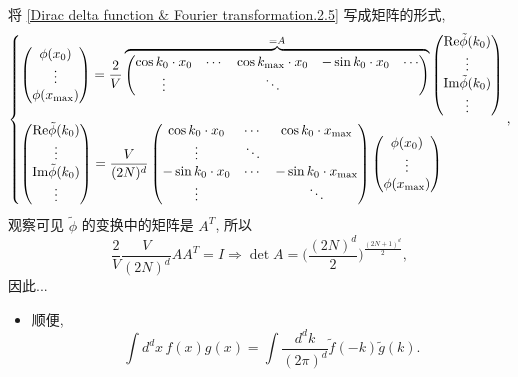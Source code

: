 \begin{itemize}
\begin{tcolorbox}[title=proof:]
		将 \eqref{Dirac delta function & Fourier transformation.2.5} 写成矩阵的形式,
		\begin{equation}
			\begin{dcases}
				\begin{pmatrix}
					\phi(x_0) \\
					\vdots \\
					\phi(x_{\max})
				\end{pmatrix} = \frac{2}{V} \overbrace{\begin{pmatrix}
					\cos k_0 \cdot x_0 & \cdots & \cos k_{\max} \cdot x_0 & - \sin k_0 \cdot x_0 & \cdots \\
					\vdots & & \ddots & &
				\end{pmatrix}}^{= A} \begin{pmatrix}
					\mathrm{Re} \tilde{\phi}(k_0) \\
					\vdots \\
					\mathrm{Im} \tilde{\phi}(k_0) \\
					\vdots
				\end{pmatrix} \\
				\begin{pmatrix}
					\mathrm{Re} \tilde{\phi}(k_0) \\
					\vdots \\
					\mathrm{Im} \tilde{\phi}(k_0) \\
					\vdots
				\end{pmatrix} = \frac{V}{(2 N)^d} \begin{pmatrix}
					\cos k_0 \cdot x_0 & \cdots & \cos k_0 \cdot x_{\max} \\
					\vdots & \ddots & \\
					- \sin k_0 \cdot x_0 & \cdots & - \sin k_0 \cdot x_{\max} \\
					\vdots & & \ddots
				\end{pmatrix} \begin{pmatrix}
					\phi(x_0) \\
					\vdots \\
					\phi(x_{\max})
				\end{pmatrix}
			\end{dcases},
		\end{equation}
		观察可见 $\tilde{\phi}$ 的变换中的矩阵是 $A^T$, 所以
		\begin{equation}
			\frac{2}{V} \frac{V}{(2 N)^d} A A^T = I \Longrightarrow \det A = \Big( \frac{(2 N)^d}{2} \Big)^{\frac{(2 N + 1)^d}{2}},
		\end{equation}
		因此...
	\end{tcolorbox}
	
	\begin{itemize}
		\item 顺便,
		\begin{equation}
			\int d^d x \, f(x) g(x) = \int \frac{d^d k}{(2 \pi)^d} \tilde{f}(- k) \tilde{g}(k).
		\end{equation}
	\end{itemize}
\end{itemize}

